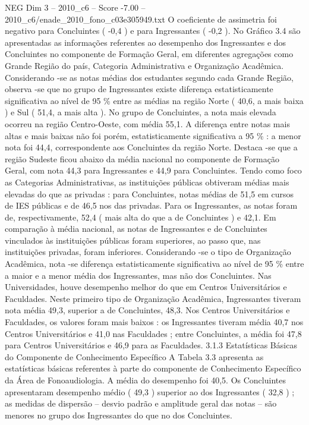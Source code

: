 \begin{textsample}{NEG Dim 3 – 2010\_c6 – Score -7.00 – 2010\_c6/enade\_2010\_fono\_c03e305949.txt}
O coeficiente de assimetria foi negativo para Concluintes ( -0,4 ) e para Ingressantes ( -0,2 ).
No Gráfico 3.4 são apresentadas as informações referentes ao desempenho dos Ingressantes e dos Concluintes no componente de Formação Geral, em diferentes agregações como Grande Região do país, Categoria Administrativa e Organização Acadêmica.
Considerando -se as notas médias dos estudantes segundo cada Grande Região, observa -se que no grupo de Ingressantes existe diferença estatisticamente significativa ao nível de 95 \% entre as médias na região Norte ( 40,6, a mais baixa ) e Sul ( 51,4, a mais alta ).
No grupo de Concluintes, a nota mais elevada ocorreu na região Centro-Oeste, com média 55,1.
A diferença entre notas mais altas e mais baixas não foi porém, estatisticamente significativa a 95 \% : a menor nota foi 44,4, correspondente aos Concluintes da região Norte.
Destaca -se que a região Sudeste ficou abaixo da média nacional no componente de Formação Geral, com nota 44,3 para Ingressantes e 44,9 para Concluintes.
Tendo como foco as Categorias Administrativas, as instituições públicas obtiveram médias mais elevadas do que as privadas : para Concluintes, notas médias de 51,5 em cursos de IES públicas e de 46,5 nos das privadas.
Para os Ingressantes, as notas foram de, respectivamente, 52,4 ( mais alta do que a de Concluintes ) e 42,1.
Em comparação à média nacional, as notas de Ingressantes e de Concluintes vinculados às instituições públicas foram superiores, ao passo que, nas instituições privadas, foram inferiores.
Considerando -se o tipo de Organização Acadêmica, nota -se diferença estatisticamente significativa ao nível de 95 \% entre a maior e a menor média dos Ingressantes, mas não dos Concluintes.
Nas Universidades, houve desempenho melhor do que em Centros Universitários e Faculdades.
Neste primeiro tipo de Organização Acadêmica, Ingressantes tiveram nota média 49,3, superior a de Concluintes, 48,3.
Nos Centros Universitários e Faculdades, os valores foram mais baixos : os Ingressantes tiveram média 40,7 nos Centros Universitários e 41,0 nas Faculdades ; entre Concluintes, a média foi 47,8 para Centros Universitários e 46,9 para as Faculdades. 3.1.3 Estatísticas Básicas do Componente de Conhecimento Específico A Tabela 3.3 apresenta as estatísticas básicas referentes à parte do componente de Conhecimento Específico da Área de Fonoaudiologia.
A média do desempenho foi 40,5.
Os Concluintes apresentaram desempenho médio ( 49,3 ) superior ao dos Ingressantes ( 32,8 ) ; as medidas de dispersão – desvio padrão e amplitude geral das notas – são menores no grupo dos Ingressantes do que no dos Concluintes.

\end{textsample}

